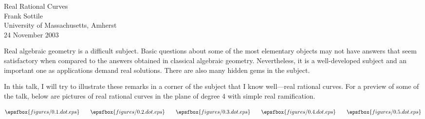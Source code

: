 \documentclass[12pt]{article}
\begin{document}
\begin{center}
\Large
Real Rational Curves\\
\large
Frank Sottile\\
University of Massachusetts, Amherst\\
24 November 2003\\

\end{center}

  Real algebraic geometry is a difficult subject.  Basic questions 
about some of the most elementary objects may not have answers that
seem satisfactory when compared to the answers obtained in classical 
algebraic geometry.  Nevertheless, it is a well-developed subject and
an important one as applications demand real solutions.  There are also
many hidden gems in the subject.

  In this talk, I will try to illustrate these remarks in a corner of the 
subject that I know well---real rational curves.  
For a preview of some of the talk, below are pictures of real rational 
curves in the plane of degree 4 with simple real ramification.

 
\[
   \epsfbox{figures/0.1.dot.eps}\qquad
   \epsfbox{figures/0.2.dot.eps}\qquad
   \epsfbox{figures/0.3.dot.eps}\qquad
   \epsfbox{figures/0.4.dot.eps}\qquad
   \epsfbox{figures/0.5.dot.eps}
\]
\end{document}

